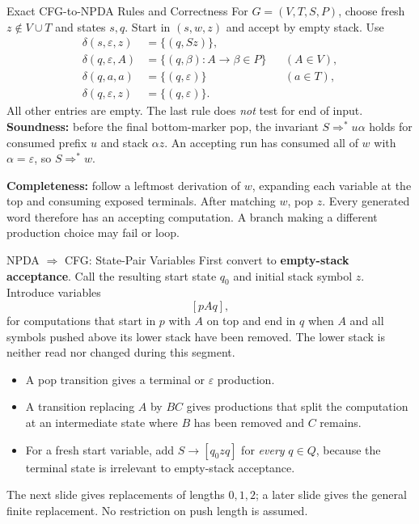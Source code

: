 \documentclass[10pt]{beamer}
\begin{document}
\begin{frame}{Exact CFG-to-NPDA Rules and Correctness}
  \small
  For $G=(V,T,S,P)$, choose fresh $z\notin V\cup T$ and states $s,q$.
  Start in $(s,w,z)$ and accept by empty stack. Use
  \[
    \begin{aligned}
      \delta(s,\varepsilon,z)&=\{(q,Sz)\},\\
      \delta(q,\varepsilon,A)&=\{(q,\beta):A\to\beta\in P\}
        &&(A\in V),\\
      \delta(q,a,a)&=\{(q,\varepsilon)\}&&(a\in T),\\
      \delta(q,\varepsilon,z)&=\{(q,\varepsilon)\}.
    \end{aligned}
  \]
  All other entries are empty. The last rule does \emph{not} test for end of input.
  \pause
  \textbf{Soundness:} before the final bottom-marker pop, the invariant
  $S\Rightarrow^*u\alpha$ holds for consumed prefix $u$ and stack $\alpha z$.
  An accepting run has consumed all of $w$ with $\alpha=\varepsilon$, so
  $S\Rightarrow^*w$.
  \pause
  \par\smallskip
  \textbf{Completeness:} follow a leftmost derivation of $w$, expanding each
  variable at the top and consuming exposed terminals. After matching $w$,
  pop $z$. Every generated word therefore has an accepting computation.
  A branch making a different production choice may fail or loop.
\end{frame}

\begin{frame}{NPDA $\Rightarrow$ CFG: State-Pair Variables}
  \small
  First convert to \textbf{empty-stack acceptance}. Call the resulting
  start state $q_0$ and initial stack symbol $z$. Introduce variables
  \[
    [pAq],
  \]
  \pause
  for computations that start in $p$ with $A$ on top and end in $q$ when
  $A$ and all symbols pushed above its lower stack have been removed.
  The lower stack is neither read nor changed during this segment.
  \begin{itemize}
    \item A pop transition gives a terminal or $\varepsilon$ production.
    \item A transition replacing $A$ by $BC$ gives productions that split the computation at an
      intermediate state where $B$ has been removed and $C$ remains.
    \item For a fresh start variable, add $S\to[q_0zq]$ for \emph{every}
      $q\in Q$, because the terminal state is irrelevant to empty-stack acceptance.
  \end{itemize}
  The next slide gives replacements of lengths $0,1,2$; a later slide gives
  the general finite replacement. No restriction on push length is assumed.
\end{frame}
\end{document}
